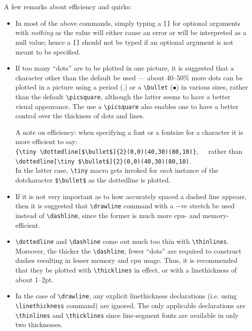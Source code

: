 A few remarks about efficiency and quirks:
\begin{itemize}
\item In most of the above commands, simply typing a {\tt []} for optional
arguments with {\it nothing\/} as the value will either cause an error or will
be interpreted as a null value; hence a {\tt []} should not be typed if an
optional argument is not meant to be specified.

\item If too many ``dots'' are to be plotted in one picture, it is suggested
that a character other than the default be used --- about 40--50\% more dots
can be plotted in a picture using a period (.) or a \verb|\bullet|
($\bullet$) in various sizes, rather than the default \verb|\picsquare|,
although the latter seems to have a better visual appearance. The
use a \verb|\picsquare| also enables one to have a better control over the
thickness of dots and lines.

A note on efficiency: when specifying a font or a fontsize for a character
it is more efficient to say:\\
\verb|{\tiny \dottedline[$\bullet$]{2}(0,0)(40,30)(80,10)}|,\ \ \ rather than\\
\verb|\dottedline[\tiny $\bullet$]{2}(0,0)(40,30)(80,10)|.\\
In the latter case, \verb|\tiny| macro gets invoked for {\it each\/} instance
of the dotcharacter \verb|$\bullet$| as the dottedline is plotted.

\item If it is not very important as to how accurately spaced a dashed line
appears, then it is suggested that \verb|\drawline| command with a $-$ve
stretch be used instead of \verb|\dashline|, since the former is much more
cpu- and memory-efficient.

\item \verb|\dottedline| and \verb|\dashline| come out much too thin with
\verb|\thinlines|. Moreover, the thicker the \verb|\dashline|, fewer
``dots'' are required to construct dashes resulting in lesser memory and cpu
usage. Thus, it is recommended that they be plotted with \verb|\thicklines|
in effect, or with a linethickness of about 1--2pt.

\item In the case of \verb|\drawline|, any explicit linethickness declarations
(i.e. using \verb|\linethickness| command) are ignored. The only applicable
declarations are \verb|\thinlines| and \verb|\thicklines| since line-segment
fonts are available in only two thicknesses.
\end{itemize}

